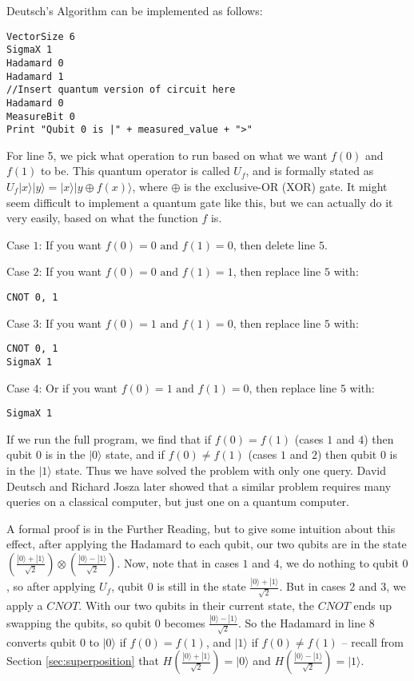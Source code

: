 \documentclass[twocolumn]{article}
\begin{document}
Deutsch's Algorithm can be implemented as follows:

\begin{lstlisting}
VectorSize 6
SigmaX 1
Hadamard 0
Hadamard 1
//Insert quantum version of circuit here
Hadamard 0
MeasureBit 0
Print "Qubit 0 is |" + measured_value + ">"
\end{lstlisting}

For line 5, we pick what operation to run based on what we want $f(0)$ and $f(1)$ to be. This quantum operator is called $U_f$, and is formally stated as $U_f|x\rangle|y\rangle = |x\rangle|y \oplus f(x)\rangle$, where $\oplus$ is the exclusive-OR (XOR) gate. It might seem difficult to implement a quantum gate like this, but we can actually do it very easily, based on what the function $f$ is.

Case $1$: If you want $f(0) = 0 \text{ and } f(1) = 0$, then delete line $5$.

Case $2$: If you want $f(0) = 0 \text{ and } f(1) = 1$, then replace line $5$ with:

\begin{lstlisting}
CNOT 0, 1
\end{lstlisting}

Case $3$: If you want $f(0) = 1 \text{ and } f(1) = 0$, then replace line $5$ with:

\begin{lstlisting}
CNOT 0, 1
SigmaX 1
\end{lstlisting}

Case $4$: Or if you want $f(0) = 1 \text{ and } f(1) = 0$, then replace line $5$ with:

\begin{lstlisting}
SigmaX 1
\end{lstlisting}

If we run the full program, we find that if $f(0) = f(1)$ (cases $1$ and $4$) then qubit $0$ is in the $|0\rangle$ state, and if $f(0) \neq f(1)$ (cases $1$ and $2$) then qubit $0$ is in the $|1\rangle$ state. Thus we have solved the problem with only one query. David Deutsch and Richard Josza later showed that a similar problem requires many queries on a classical computer, but just one on a quantum computer.

A formal proof is in the Further Reading, but to give some intuition about this effect, after applying the Hadamard to each qubit, our two qubits are in the state $\left(\frac{|0\rangle + |1\rangle}{\sqrt{2}}\right) \otimes \left(\frac{|0\rangle - |1\rangle}{\sqrt{2}}\right)$. Now, note that in cases $1$ and $4$, we do nothing to qubit $0$, so after applying $U_f$, qubit $0$ is still in the state $\frac{|0\rangle + |1\rangle}{\sqrt{2}}$. But in cases $2$ and $3$, we apply a $CNOT$. With our two qubits in their current state, the $CNOT$ ends up swapping the qubits, so qubit $0$ becomes $\frac{|0\rangle - |1\rangle}{\sqrt{2}}$. So the Hadamard in line $8$ converts qubit $0$ to $|0\rangle$ if $f(0) = f(1)$, and $|1\rangle$ if $f(0) \neq f(1)$ -- recall from Section \ref{sec:superposition} that $H\left(\frac{|0\rangle + |1\rangle}{\sqrt{2}}\right) = |0\rangle$ and $H\left(\frac{|0\rangle - |1\rangle}{\sqrt{2}}\right) = |1\rangle$.
\end{document}
